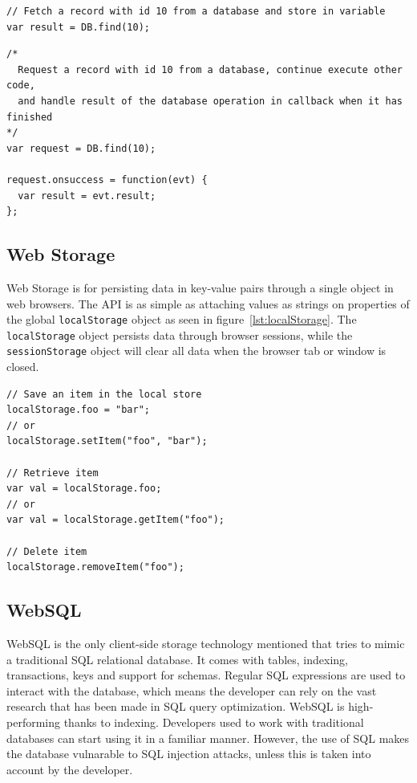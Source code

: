 \begin{Code}
\begin{lstlisting}[caption={Synchronous call}, label={lst:syncCall}]
// Fetch a record with id 10 from a database and store in variable
var result = DB.find(10);
\end{lstlisting}

\begin{lstlisting}[caption={Asynchronous call}, label={lst:asyncCall}]
/*
  Request a record with id 10 from a database, continue execute other code,
  and handle result of the database operation in callback when it has finished
*/
var request = DB.find(10);

request.onsuccess = function(evt) {
  var result = evt.result;
};
\end{lstlisting}
\end{Code}


\subsection{Web Storage}
Web Storage is for persisting data in key-value pairs through a single object in web browsers. The API is as simple as attaching values as strings on properties of the global \texttt{localStorage} object as seen in figure~\ref{lst:localStorage}. The \texttt{localStorage} object persists data through browser sessions, while the \texttt{sessionStorage} object will clear all data when the browser tab or window is closed.

\begin{Code}
\begin{lstlisting}[caption={Use of Web Storage}, label={lst:localStorage}]
// Save an item in the local store
localStorage.foo = "bar";
// or
localStorage.setItem("foo", "bar");

// Retrieve item
var val = localStorage.foo;
// or
var val = localStorage.getItem("foo");

// Delete item
localStorage.removeItem("foo");
\end{lstlisting}
\end{Code}

\subsection{WebSQL}
\label{sec:websql}
WebSQL is the only client-side storage technology mentioned that tries to mimic a traditional SQL relational database. It comes with tables, indexing, transactions, keys and support for schemas. Regular SQL expressions are used to interact with the database, which means the developer can rely on the vast research that has been made in SQL query optimization. WebSQL is high-performing thanks to indexing. Developers used to work with traditional databases can start using it in a familiar manner. However, the use of SQL makes the database vulnarable to SQL injection attacks, unless this is taken into account by the developer.

